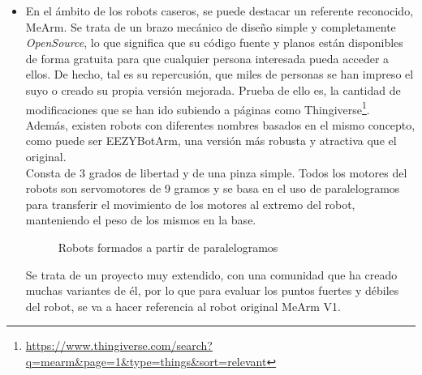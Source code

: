 \begin{itemize}
    \newpage
    \item En el ámbito de los robots caseros, se puede destacar un referente reconocido, MeArm. Se trata de un 
    brazo mecánico de diseño simple y completamente \textit{OpenSource}, lo que significa que su código fuente y planos están disponibles 
    de forma gratuita para que cualquier persona interesada pueda acceder a ellos. De hecho, tal es su repercusión, que miles de personas 
    se han impreso el suyo o creado su propia versión mejorada. Prueba de ello es, la cantidad de modificaciones que se han ido subiendo a  
    páginas como Thingiverse\footnote{\url{https://www.thingiverse.com/search?q=mearm&page=1&type=things&sort=relevant}}. Además, existen 
    robots con diferentes nombres basados en el mismo concepto, como puede ser EEZYBotArm, una versión más robusta y atractiva que el original. \\
    Consta de 3 grados de libertad y de una pinza simple. Todos los motores del robots son servomotores de 9 gramos y se basa en el uso de 
    paralelogramos para transferir el movimiento de los motores al extremo del robot, manteniendo el peso de los mismos en la base. 
    \begin{figure} [h!]
        \centering    
        \hspace{3cm}
        \caption{Robots formados a partir de paralelogramos}
    \end{figure}
    \newpage
    Se trata de un proyecto muy extendido, con una comunidad que ha creado muchas variantes de él, por lo que para evaluar los puntos fuertes y 
    débiles del robot, se va a hacer referencia al robot original MeArm V1.

\end{itemize}
